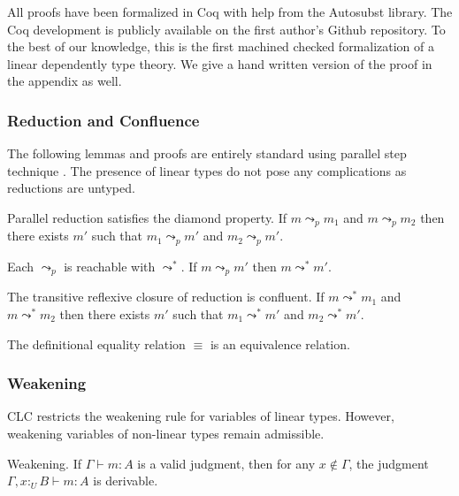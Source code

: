 \documentclass[sigplan,screen,review,authordraft]{acmart}
\newcommand{\utype}{:_{\scriptscriptstyle U}}
\newcommand{\step}{\leadsto}
\newcommand{\pstep}{\leadsto}
\begin{document}
All proofs have been formalized in Coq with help from the Autosubst \cite{autosubst} library. The Coq development is publicly available on the first author's Github repository. To the best of our knowledge, this is the first machined checked formalization of a linear dependently type theory. We give a hand written version of the proof in the appendix as well.

\subsubsection{Reduction and Confluence}

The following lemmas and proofs are entirely standard using parallel step technique \cite{takahashi}. The presence of linear types do not pose any complications as reductions are untyped.

\begin{lemma}
  Parallel reduction satisfies the diamond property. If $m \pstep_p m_1$ and $m \pstep_p m_2$ then there exists $m'$ such that $m_1 \pstep_p m'$ and $m_2 \pstep_p m'$.
\end{lemma}

\begin{lemma}
  Each $\pstep_p$ is reachable with $\step^*$. If $m \pstep_p m'$ then $m \step^* m'$.
\end{lemma}

\begin{theorem}
  The transitive reflexive closure of reduction is confluent. If $m \step^* m_1$ and $m \step^* m_2$ then there exists $m'$ such that $m_1 \pstep^* m'$ and $m_2 \pstep^* m'$.
\end{theorem}

\begin{corollary}
  The definitional equality relation $\equiv$ is an equivalence relation.
\end{corollary}

\subsubsection{Weakening} \label{weakening}
CLC restricts the weakening rule for variables of linear types. However, weakening variables of non-linear types remain admissible.

\begin{lemma}
  Weakening. If $\Gamma \vdash m : A$ is a valid judgment, then for any $x \notin \Gamma$, the judgment $\Gamma, x \utype B \vdash m : A$ is derivable.
\end{lemma}
\end{document}

